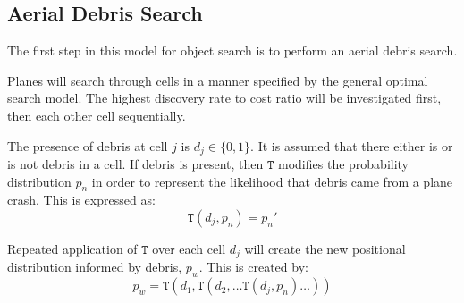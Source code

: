 \documentclass[a4paper,twocolumns]{article}
\begin{document}
\begin{multicols}{2}
\section{Aerial Debris Search}

The first step in this model for object search is to perform an aerial debris search. 

Planes will search through cells in a manner specified by the general optimal search model. The highest discovery rate to cost ratio will be investigated first, then each other cell sequentially.

The presence of debris at cell $j$ is $d_j\in \{0,1\}$. It is assumed that there either is or is not debris in a cell. If debris is present, then $\mathtt{T}$ modifies the probability distribution $p_n$ in order to represent the likelihood that debris came from a plane crash. This is expressed as: $$\mathtt{T}(d_j,p_n)=p_n'$$

Repeated application of $\mathtt{T}$ over each cell $d_j$ will create the new positional distribution informed by debris, $p_w$. This is created by: $$p_w=\mathtt{T}(d_1, \mathtt{T}(d_2, \ldots \mathtt{T}(d_j, p_n)\ldots))$$

\end{multicols}
\end{document}
